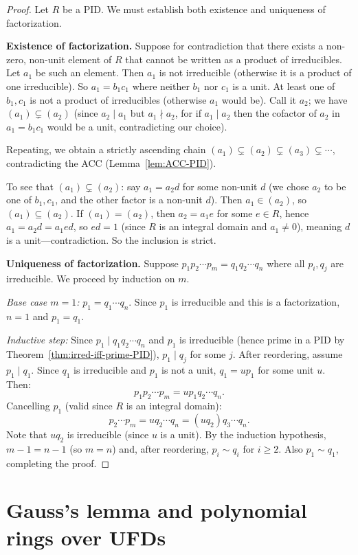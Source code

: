 \documentclass[12pt,a4paper,openany]{book}
\theoremstyle{definition}
\theoremstyle{remark}
\begin{document}
\begin{proof}
Let $R$ be a PID. We must establish both existence and uniqueness of factorization.

\textbf{Existence of factorization.} Suppose for contradiction that there exists a non-zero, non-unit element of $R$ that cannot be written as a product of irreducibles. Let $a_1$ be such an element. Then $a_1$ is not irreducible (otherwise it is a product of one irreducible). So $a_1=b_1c_1$ where neither $b_1$ nor $c_1$ is a unit. At least one of $b_1,c_1$ is not a product of irreducibles (otherwise $a_1$ would be). Call it $a_2$; we have $(a_1)\subsetneq(a_2)$ (since $a_2\mid a_1$ but $a_1\nmid a_2$, for if $a_1\mid a_2$ then the cofactor of $a_2$ in $a_1=b_1c_1$ would be a unit, contradicting our choice).

Repeating, we obtain a strictly ascending chain $(a_1)\subsetneq(a_2)\subsetneq(a_3)\subsetneq\cdots$, contradicting the ACC (Lemma~\ref{lem:ACC-PID}).

To see that $(a_1)\subsetneq(a_2)$: say $a_1=a_2d$ for some non-unit $d$ (we chose $a_2$ to be one of $b_1,c_1$, and the other factor is a non-unit $d$). Then $a_1\in(a_2)$, so $(a_1)\subseteq(a_2)$. If $(a_1)=(a_2)$, then $a_2=a_1e$ for some $e\in R$, hence $a_1=a_2d=a_1ed$, so $ed=1$ (since $R$ is an integral domain and $a_1\neq 0$), meaning $d$ is a unit---contradiction. So the inclusion is strict.

\textbf{Uniqueness of factorization.} Suppose $p_1p_2\cdots p_m=q_1q_2\cdots q_n$ where all $p_i,q_j$ are irreducible. We proceed by induction on $m$.

\emph{Base case $m=1$:} $p_1=q_1\cdots q_n$. Since $p_1$ is irreducible and this is a factorization, $n=1$ and $p_1=q_1$.

\emph{Inductive step:} Since $p_1\mid q_1q_2\cdots q_n$ and $p_1$ is irreducible (hence prime in a PID by Theorem~\ref{thm:irred-iff-prime-PID}), $p_1\mid q_j$ for some $j$. After reordering, assume $p_1\mid q_1$. Since $q_1$ is irreducible and $p_1$ is not a unit, $q_1=up_1$ for some unit $u$. Then:
\[
    p_1p_2\cdots p_m = up_1q_2\cdots q_n.
\]
Cancelling $p_1$ (valid since $R$ is an integral domain):
\[
    p_2\cdots p_m = uq_2\cdots q_n = (uq_2)q_3\cdots q_n.
\]
Note that $uq_2$ is irreducible (since $u$ is a unit). By the induction hypothesis, $m-1=n-1$ (so $m=n$) and, after reordering, $p_i\sim q_i$ for $i\geq 2$. Also $p_1\sim q_1$, completing the proof.
\end{proof}

\section{Gauss's lemma and polynomial rings over UFDs}\label{sec:gauss-lemma}
\end{document}
